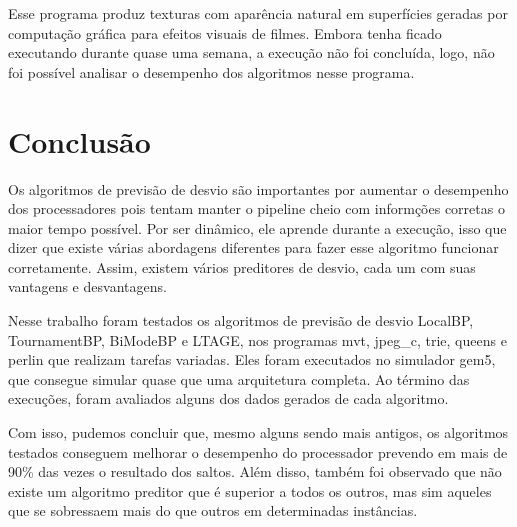 \documentclass[12pt]{article}
\begin{document}
Esse programa produz texturas com aparência natural em superfícies geradas por computação gráfica para efeitos visuais de filmes. Embora tenha ficado executando durante quase uma semana, a execução não foi concluída, logo, não foi possível analisar o desempenho dos algoritmos nesse programa. 

\section{Conclusão}

Os algoritmos de previsão de desvio são importantes por aumentar o desempenho dos processadores pois tentam manter o pipeline cheio com informções corretas o maior tempo possível. Por ser dinâmico, ele aprende durante a execução, isso que dizer que existe várias abordagens diferentes para fazer esse algoritmo funcionar corretamente. Assim, existem vários preditores de desvio, cada um com suas vantagens e desvantagens.

Nesse trabalho foram testados os algoritmos de previsão de desvio LocalBP, TournamentBP, BiModeBP e LTAGE, nos programas mvt, jpeg\_c, trie, queens e perlin que realizam tarefas variadas. Eles foram executados no simulador gem5, que consegue simular quase que uma arquitetura completa. Ao término das execuções, foram avaliados alguns dos dados gerados de cada algoritmo.

Com isso, pudemos concluir que, mesmo alguns sendo mais antigos, os algoritmos testados conseguem melhorar o desempenho do processador prevendo em mais de 90\% das vezes o resultado dos saltos. Além disso, também foi observado que não existe um algoritmo preditor que é superior a todos os outros, mas sim aqueles que se sobressaem mais do que outros em determinadas instâncias.




\end{document}
